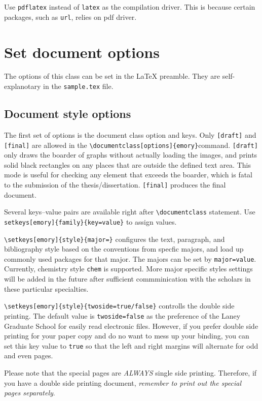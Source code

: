 \documentclass[draft]{emory}
\begin{document}
Use \Verb|pdflatex| instead of \Verb|latex| as the compilation driver. This
is because certain packages, such as \Verb|url|, relies on pdf driver. 


\section{Set document options}\label{sec:options}
The options of this class can be set in the \LaTeX{} preamble. They are 
self-explanotary in the \Verb|sample.tex| file. 

\subsection{Document style options}
The first set of options is the document class option and keys.
Only \Verb|[draft]| and \Verb|[final]| are allowed in the \Verb|\documentclass[options]{emory}|command.
\Verb|[draft]| only draws the boarder of graphs without actually loading the images,
and prints solid black rectangles on any places that are outside the defined text area. 
This mode is useful for checking any element that exceeds the boarder,
which is fatal to the submission of the thesis/dissertation.
\Verb|[final]| produces the final document. 

Several keys--value pairs are available right after \Verb|\documentclass| statement.
Use \Verb|setkeys[emory]{family}{key=value}| to assign values.

\Verb|\setkeys[emory]{style}{major=}| configures the text, paragraph, and 
bibliography style based on the conventions
from specfic majors, and load up commonly used packages for that major.
The majors can be set by \Verb|major=value|.
Currently, chemistry style \Verb|chem| is supported. More major specific styles
settings will be added in the future after sufficient commminication with 
the scholars in these particular specialties. 

\Verb|\setkeys[emory]{style}{twoside=true/false}| controlls the double side printing.
The default value is \Verb|twoside=false| as the preference of the Laney Graduate School for easily read electronic files. 
However, if you prefer double side printing for your paper copy and do no want 
to mess up your binding,
you can set this key value to \Verb|true| so that the left and right margins will alternate for odd and even pages. 

Please note that the special pages are \emph{ALWAYS} single side printing. 
Therefore, if you have a double side printing document, \emph{remember to print out
the special pages separately}.
\end{document}
